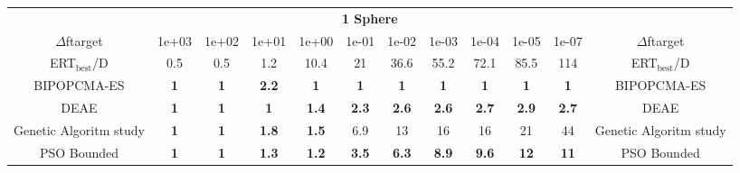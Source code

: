 \begin{tabular}{cccccccccccc}
 & \multicolumn{10}{c}{{\normalsize \textbf{1 Sphere}}}\\
$\Delta$ftarget& 1e+03& 1e+02& 1e+01& 1e+00& 1e-01& 1e-02& 1e-03& 1e-04& 1e-05& 1e-07 & $\Delta$ftarget \\
ERT$_{\textrm{best}}$/D& 0.5& 0.5& 1.2& 10.4& 21& 36.6& 55.2& 72.1& 85.5& 114 & ERT$_{\textrm{best}}$/D \\
\hline
BIPOPCMA-ES & \textbf{1} & \textbf{1} & \textbf{2.2} & \textbf{1} & \textbf{1} & \textbf{1} & \textbf{1} & \textbf{1} & \textbf{1} & \textbf{1} & BIPOPCMA-ES \cite{add_an_entry_for_BIPOPCMA-ES_in_bbob.bib}\\
DEAE & \textbf{1} & \textbf{1} & \textbf{1} & \textbf{1.4} & \textbf{2.3} & \textbf{2.6} & \textbf{2.6} & \textbf{2.7} & \textbf{2.9} & \textbf{2.7} & DEAE \cite{add_an_entry_for_DEAE_in_bbob.bib}\\
Genetic Algoritm study & \textbf{1} & \textbf{1} & \textbf{1.8} & \textbf{1.5} & 6.9 & 13 & 16 & 16 & 21 & 44 & Genetic Algoritm study \cite{add_an_entry_for_Genetic Algoritm study_in_bbob.bib}\\
PSO Bounded & \textbf{1} & \textbf{1} & \textbf{1.3} & \textbf{1.2} & \textbf{3.5} & \textbf{6.3} & \textbf{8.9} & \textbf{9.6} & \textbf{12} & \textbf{11} & PSO Bounded \cite{add_an_entry_for_PSO Bounded_in_bbob.bib}
\end{tabular}
